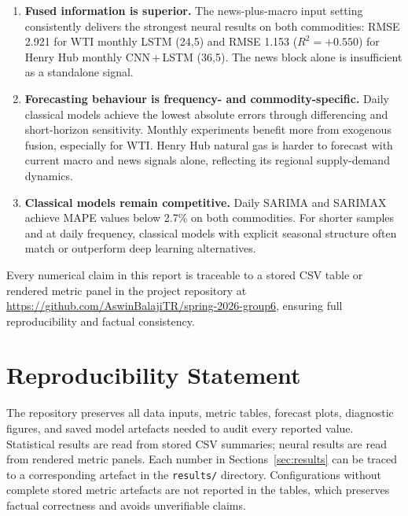 \documentclass[12pt,a4paper]{article}
\begin{document}
\begin{enumerate}[leftmargin=*]
  \item \textbf{Fused information is superior.} The news-plus-macro input setting consistently delivers the strongest neural results on both commodities: RMSE 2.921 for WTI monthly LSTM (24,5) and RMSE 1.153 ($R^2 = +0.550$) for Henry Hub monthly CNN\,+\,LSTM (36,5). The news block alone is insufficient as a standalone signal.

  \item \textbf{Forecasting behaviour is frequency- and commodity-specific.} Daily classical models achieve the lowest absolute errors through differencing and short-horizon sensitivity. Monthly experiments benefit more from exogenous fusion, especially for WTI. Henry Hub natural gas is harder to forecast with current macro and news signals alone, reflecting its regional supply-demand dynamics.

  \item \textbf{Classical models remain competitive.} Daily SARIMA and SARIMAX achieve MAPE values below 2.7\% on both commodities. For shorter samples and at daily frequency, classical models with explicit seasonal structure often match or outperform deep learning alternatives.
\end{enumerate}

Every numerical claim in this report is traceable to a stored CSV table or rendered metric panel in the project repository at \url{https://github.com/AswinBalajiTR/spring-2026-group6}, ensuring full reproducibility and factual consistency.

\section{Reproducibility Statement}\label{sec:reproducibility}

The repository preserves all data inputs, metric tables, forecast plots, diagnostic figures, and saved model artefacts needed to audit every reported value. Statistical results are read from stored CSV summaries; neural results are read from rendered metric panels. Each number in Sections~\ref{sec:results} can be traced to a corresponding artefact in the \texttt{results/} directory. Configurations without complete stored metric artefacts are not reported in the tables, which preserves factual correctness and avoids unverifiable claims.
\end{document}
